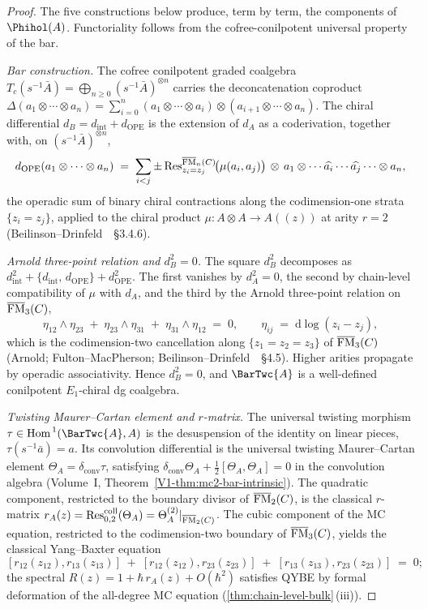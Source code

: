 \begin{proof}
The five constructions below produce, term by term, the components of
$\Phihol(A)$.  Functoriality follows from the cofree-conilpotent
universal property of the bar.

\emph{Bar construction.}
The cofree conilpotent graded coalgebra
$T_{c}(s^{-1}\bar{A}) = \bigoplus_{n \ge 0} (s^{-1}\bar{A})^{\otimes n}$
carries the deconcatenation coproduct
$\Delta(a_{1} \otimes \cdots \otimes a_{n})
 = \sum_{i=0}^{n} (a_{1} \otimes \cdots \otimes a_{i}) \otimes
 (a_{i+1} \otimes \cdots \otimes a_{n})$.
The chiral differential $d_{B} = d_{\mathrm{int}} + d_{\mathrm{OPE}}$
is the extension of $d_{A}$ as a coderivation, together with, on
$(s^{-1}\bar{A})^{\otimes n}$,
\[
 d_{\mathrm{OPE}}(a_{1} \otimes \cdots \otimes a_{n})
 \;=\; \sum_{i < j} \pm\,
 \mathrm{Res}_{z_{i}=z_{j}}^{\overline{\mathrm{FM}}_{n}(C)}\!
 \bigl(\mu(a_{i}, a_{j})\bigr)
 \,\otimes\, a_{1} \otimes \cdots
 \widehat{a_{i}} \cdots \widehat{a_{j}} \cdots \otimes a_{n},
\]
the operadic sum of binary chiral contractions along the
codimension-one strata $\{z_{i} = z_{j}\}$, applied to the chiral
product $\mu : A \otimes A \to A((z))$ at arity $r = 2$
(Beilinson--Drinfeld~\cite{BD04}~\S 3.4.6).

\emph{Arnold three-point relation and $d_B^2=0$.}
The square $d_{B}^{2}$ decomposes as $d_{\mathrm{int}}^{2} +
\{d_{\mathrm{int}},\, d_{\mathrm{OPE}}\} + d_{\mathrm{OPE}}^{2}$.
The first vanishes by $d_{A}^{2} = 0$, the second by chain-level
compatibility of $\mu$ with $d_{A}$, and the third by the Arnold
three-point relation on $\overline{\mathrm{FM}}_{3}(C)$,
\[
 \eta_{12} \wedge \eta_{23} \;+\; \eta_{23} \wedge \eta_{31}
 \;+\; \eta_{31} \wedge \eta_{12} \;=\; 0,
\qquad
 \eta_{ij} \;=\; \mathrm{d}\log(z_{i} - z_{j}),
\]
which is the codimension-two cancellation along $\{z_{1} = z_{2} =
z_{3}\}$ of $\overline{\mathrm{FM}}_{3}(C)$
(Arnold; Fulton--MacPherson; Beilinson--Drinfeld~\cite{BD04}~\S 4.5).
Higher arities propagate by operadic associativity.  Hence
$d_{B}^{2} = 0$, and $\BarTwc{A}$ is a well-defined conilpotent
$E_{1}$-chiral dg coalgebra.

\emph{Twisting Maurer--Cartan element and $r$-matrix.}
The universal twisting morphism $\tau \in
\mathrm{Hom}^{\,1}(\BarTwc{A}, A)$ is the desuspension of the identity
on linear pieces, $\tau(s^{-1}\bar{a}) = a$.  Its convolution
differential is the universal twisting Maurer--Cartan element
$\Theta_{A} = \delta_{\mathrm{conv}}\tau$, satisfying
$\delta_{\mathrm{conv}}\Theta_{A} + \tfrac{1}{2}[\Theta_{A},\Theta_{A}]
 = 0$ in the convolution algebra
(Volume~I, Theorem~\ref*{V1-thm:mc2-bar-intrinsic}).  The quadratic
component, restricted to the boundary divisor of $\overline{\mathrm{FM}}_{2}(C)$,
is the classical $r$-matrix
$r_{A}(z) = \mathrm{Res}^{\mathrm{coll}}_{0,2}(\Theta_{A})
 = \Theta_{A}^{(2)}|_{\overline{\mathrm{FM}}_{2}(C)}$.
The cubic component of the MC equation, restricted to the
codimension-two boundary of $\overline{\mathrm{FM}}_{3}(C)$, yields the
classical Yang--Baxter equation
\[
 [r_{12}(z_{12}), r_{13}(z_{13})]
 \;+\; [r_{12}(z_{12}), r_{23}(z_{23})]
 \;+\; [r_{13}(z_{13}), r_{23}(z_{23})] \;=\; 0;
\]
the spectral $R(z) = 1 + \hbar\,r_{A}(z) + O(\hbar^{2})$ satisfies
QYBE by formal deformation of the all-degree MC equation
(\cref{thm:chain-level-bulk}\,(iii)).


\end{proof}
